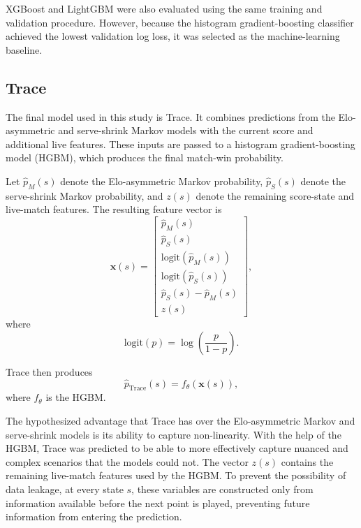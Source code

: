 \documentclass[10pt,twocolumn]{article}
\begin{document}
XGBoost and LightGBM were also evaluated using the same training and validation procedure.\cite{chen2016,ke2017} However, because the histogram gradient-boosting classifier achieved the lowest validation log loss, it was selected as the machine-learning baseline.

\subsection{Trace}

The final model used in this study is Trace. It combines predictions from the Elo-asymmetric and serve-shrink Markov models with the current score and additional live features. These inputs are passed to a histogram gradient-boosting model (HGBM), which produces the final match-win probability.

Let $\hat{p}_M(s)$ denote the Elo-asymmetric Markov probability, $\hat{p}_S(s)$ denote the serve-shrink Markov probability, and $z(s)$ denote the remaining score-state and live-match features. The resulting feature vector is
\begin{equation}
\mathbf{x}(s)=
\begin{bmatrix}
\hat{p}_M(s)\\
\hat{p}_S(s)\\
\mathrm{logit}(\hat{p}_M(s))\\
\mathrm{logit}(\hat{p}_S(s))\\
\hat{p}_S(s)-\hat{p}_M(s)\\
z(s)
\end{bmatrix},
\end{equation}
where
\begin{equation}
\mathrm{logit}(p)=\log\!\left(\frac{p}{1-p}\right).
\end{equation}

Trace then produces
\begin{equation}
\hat{p}_{\mathrm{Trace}}(s)=f_{\theta}(\mathbf{x}(s)),
\end{equation}
where $f_{\theta}$ is the HGBM.

The hypothesized advantage that Trace has over the Elo-asymmetric Markov and serve-shrink models is its ability to capture non-linearity. With the help of the HGBM, Trace was predicted to be able to more effectively capture nuanced and complex scenarios that the models could not. The vector $z(s)$ contains the remaining live-match features used by the HGBM. To prevent the possibility of data leakage, at every state $s$, these variables are constructed only from information available before the next point is played, preventing future information from entering the prediction.
\end{document}
